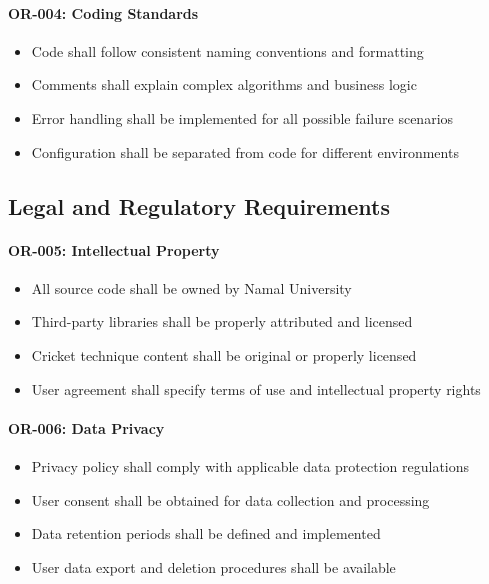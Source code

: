 \documentclass[12pt,a4paper]{article}
\begin{document}
\begin{enumerate}
\paragraph{OR-004: Coding Standards}
\begin{itemize}
    \item Code shall follow consistent naming conventions and formatting
    \item Comments shall explain complex algorithms and business logic
    \item Error handling shall be implemented for all possible failure scenarios
    \item Configuration shall be separated from code for different environments
\end{itemize}

\subsection{Legal and Regulatory Requirements}

\paragraph{OR-005: Intellectual Property}
\begin{itemize}
    \item All source code shall be owned by Namal University
    \item Third-party libraries shall be properly attributed and licensed
    \item Cricket technique content shall be original or properly licensed
    \item User agreement shall specify terms of use and intellectual property rights
\end{itemize}

\paragraph{OR-006: Data Privacy}
\begin{itemize}
    \item Privacy policy shall comply with applicable data protection regulations
    \item User consent shall be obtained for data collection and processing
    \item Data retention periods shall be defined and implemented
    \item User data export and deletion procedures shall be available
\end{itemize}


\end{enumerate}
\end{document}
